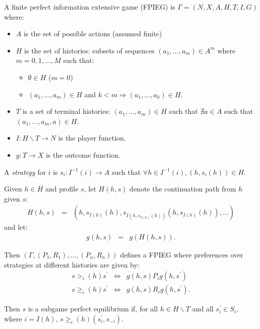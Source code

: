 \documentclass[12pt]{article}
\newcommand{\n}{\noindent}
\newcommand{\s}{\vspace{5mm}}
\begin{document}
\s
\n A finite perfect information extensive game (FPIEG) is $\Gamma=(N,X,A,H,T,I,G)$ where:
\begin{itemize}
\item $A$ is the set of possible actions (assumed finite)
\item $H$ is the set of histories: subsets of sequences $(a_1,\hdots,a_m)\in A^m$ where $m=0,1,\hdots,M$ such that:
\begin{itemize}
\item $\emptyset\in H$ ($m=0$)
\item $(a_1,\hdots,a_m)\in H$ and $k<m\Rightarrow (a_1,\hdots,a_k)\in H$.
\end{itemize}
\item $T$ is a set of terminal histories: $(a_1,\hdots,a_m)\in H$ such that $\nexists a\in A$ such that $(a_1,\hdots,a_m,a)\in H$.
\item $I:H\backslash T\longrightarrow N$ is the player function.
\item $g:T\longrightarrow X$ is the outcome function.
\end{itemize}

\s
\n A \textit{strategy} for $i$ is $s_i:I^{-1}(i)\longrightarrow A$ such that $\forall h\in I^{-1}(i), (h,s_i(h))\in H$.

\s
\n Given $h\in H$ and profile $s$, let $H(h,s)$ denote the continuation path from $h$ given $s$:
\begin{eqnarray*}
H(h,s)&=&\left(h,s_{I(h)}(h), s_{I(h,s_{I(h)}(h))}(h,s_{I(h)}(h)), \hdots\right)
\end{eqnarray*} and let:
\begin{eqnarray*}
g(h,s)&=&g(H(h,s)).
\end{eqnarray*}

\s
\n Then $\left(\Gamma,(P_1,R_1),\hdots,(P_n,R_n)\right)$ defines a FPIEG where preferences over strategies at different histories are given by:
\begin{eqnarray*}
s>_i(h)s^{\prime} &\Longleftrightarrow&g(h,s)P_ig(h,s^{\prime})\\
s\geq_i(h)s^{\prime} &\Longleftrightarrow&g(h,s)R_ig(h,s^{\prime}).
\end{eqnarray*}

\s
\n  Then $s$ is a subgame perfect equilibrium if, for all $h\in H\backslash T$ and all $s_i^{\prime}\in S_i$, where $i=I(h)$, $s\geq_i(h) (s_i^{\prime},s_{-i})$.
\end{document}
